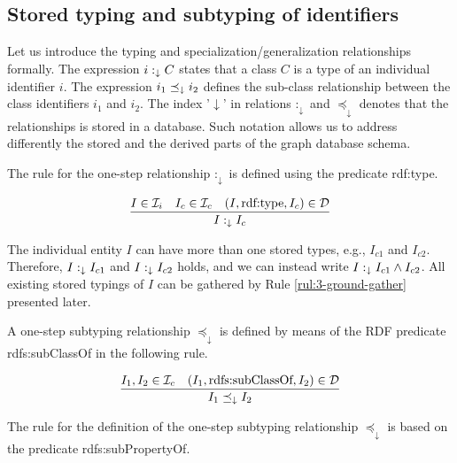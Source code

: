 \documentclass[runningheads]{llncs}
\newcommand{\darr}{\downarrow}
\newcommand{\D}{{\cal D}}
\newcommand{\Ii}{{\cal I}_i}
\newcommand{\Ic}{{\cal I}_c}
\newcommand{\memo}[1]{}
\newcommand{\notes}[1]{\noindent\begin{small}-- \emph{#1}\\\end{small}}
\begin{document}
\subsection{Stored typing and subtyping of identifiers\label{section:idents-stored}}

Let us introduce the typing and specialization/generalization
relationships formally. The expression $i:_\darr\/C$ states that a
class $C$ is a type of an individual identifier $i$. The expression
$i_1\preceq_\darr\/i_2$ defines the sub-class relationship between the
class identifiers $i_1$ and $i_2$. The index '$\darr$' in relations
$:_\darr$ and $\preceq_\darr$ denotes that the relationships is stored
in a database. Such notation allows us to address differently the
stored and the derived parts of the graph database schema.


\memo{Oportunity to introduce ``mixed'' objects including ground and schema components.}

The rule for the one-step relationship $:_\darr$ is defined using the
predicate rdf:type.

\begin{equation}
\dfrac{I\in\Ii\quad I_c\in\Ic\quad (I,\text{rdf:type},I_c)\in \D}
      {I :_\darr I_c}
\end{equation}

The individual entity $I$ can have more than one stored types, e.g.,
$I_{c1}$ and $I_{c2}$. Therefore, $I:_\darr\/I_{c1}$ and
$I:_\darr\/I_{c2}$ holds, and we can instead write
$I:_\darr\/I_{c1}\land\/I_{c2}$. All existing stored typings of $I$
can be gathered by Rule \ref{rul:3-ground-gather} presented later.

A one-step subtyping relationship $\preceq_\darr$ is defined by means
of the RDF predicate rdfs:sub\-ClassOf in the following rule.

\begin{equation}
\dfrac{I_1,I_2\in\Ic \quad (I_1,\text{rdfs:subClassOf},I_2)\in \D}
{I_1 \preceq_\darr\/I_2}
\end{equation}

The rule for the definition of the one-step subtyping relationship
$\preceq_\darr$ is based on the predicate rdfs:subPropertyOf.
\end{document}
